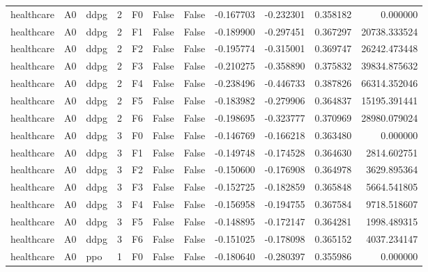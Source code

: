 \begin{tabular}{lllrlllrrrr}
healthcare &      A0 &      ddpg &     2 &  F0 &           False &            False & -0.167703 & -0.232301 & 0.358182 &         0.000000 \\
healthcare &      A0 &      ddpg &     2 &  F1 &           False &            False & -0.189900 & -0.297451 & 0.367297 &     20738.333524 \\
healthcare &      A0 &      ddpg &     2 &  F2 &           False &            False & -0.195774 & -0.315001 & 0.369747 &     26242.473448 \\
healthcare &      A0 &      ddpg &     2 &  F3 &           False &            False & -0.210275 & -0.358890 & 0.375832 &     39834.875632 \\
healthcare &      A0 &      ddpg &     2 &  F4 &           False &            False & -0.238496 & -0.446733 & 0.387826 &     66314.352046 \\
healthcare &      A0 &      ddpg &     2 &  F5 &           False &            False & -0.183982 & -0.279906 & 0.364837 &     15195.391441 \\
healthcare &      A0 &      ddpg &     2 &  F6 &           False &            False & -0.198695 & -0.323777 & 0.370969 &     28980.079024 \\
healthcare &      A0 &      ddpg &     3 &  F0 &           False &            False & -0.146769 & -0.166218 & 0.363480 &         0.000000 \\
healthcare &      A0 &      ddpg &     3 &  F1 &           False &            False & -0.149748 & -0.174528 & 0.364630 &      2814.602751 \\
healthcare &      A0 &      ddpg &     3 &  F2 &           False &            False & -0.150600 & -0.176908 & 0.364978 &      3629.895364 \\
healthcare &      A0 &      ddpg &     3 &  F3 &           False &            False & -0.152725 & -0.182859 & 0.365848 &      5664.541805 \\
healthcare &      A0 &      ddpg &     3 &  F4 &           False &            False & -0.156958 & -0.194755 & 0.367584 &      9718.518607 \\
healthcare &      A0 &      ddpg &     3 &  F5 &           False &            False & -0.148895 & -0.172147 & 0.364281 &      1998.489315 \\
healthcare &      A0 &      ddpg &     3 &  F6 &           False &            False & -0.151025 & -0.178098 & 0.365152 &      4037.234147 \\
healthcare &      A0 &       ppo &     1 &  F0 &           False &            False & -0.180640 & -0.280397 & 0.355986 &         0.000000 \\

\end{tabular}
